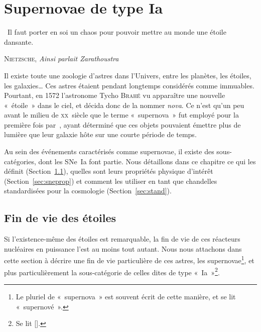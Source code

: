 \documentclass[../main/main.tex]{subfiles}
\begin{document}
\raggedbottom


\chapter{Supernovae de type Ia}\label{ch:sne}

\epigraph{\openquote\ Il faut porter en soi un chaos pour pouvoir mettre
au monde une étoile dansante.\closequote}{\textsc{Nietzsche}, \textit{Ainsi
parlait Zarathoustra}}

Il existe toute une zoologie d'astres dans l'Univers, entre les planètes, les
étoiles, les galaxies… Ces astres étaient pendant longtemps considérés comme
immuables. Pourtant, en 1572 l'astronome Tycho \textsc{Brahé} vu apparaître une
nouvelle «~étoile~» dans le ciel, et décida donc de la nommer \textit{nova}. Ce
n'est qu'un peu avant le milieu de \textsc{xx}\ieme~siècle que le terme
«~supernova~» fut employé pour la première fois par~\cite{baade1934}, ayant
déterminé que ces objets pouvaient émettre plus de lumière que leur galaxie hôte
sur une courte période de temps.

Au sein des événements caractérisés comme supernovae, il existe des
sous-catégories, dont les SNe~Ia font partie. Nous détaillons dans ce chapitre
ce qui les définit (Section~\ref{sec:death}), quelles sont leurs propriétés
physique d'intérêt (Section~\ref{sec:sneprop}) et comment les utiliser en tant
que chandelles standardisées pour la cosmologie (Section~\ref{sec:stand}).

\vfill
\minitoc
\vfill

\newpage

\thispagestyle{plain}
\vspace*{\fill}
\minilof
\vspace*{\fill}

\newpage

\section{Fin de vie des étoiles}\label{sec:death}

Si l'existence-même des étoiles est remarquable, la fin de vie de ces réacteurs
nucléaires en puissance l'est au moins tout autant. Nous nous attachons dans
cette section à décrire une fin de vie particulière de ces astres, les
supernovae\footnote{Le pluriel de «~supernova~» est souvent écrit de cette
manière, et se lit «~supernové~».}, et plus particulièrement la sous-catégorie
de celles dites de type «~Ia~»\footnote{Se lit [].}.
\end{document}
